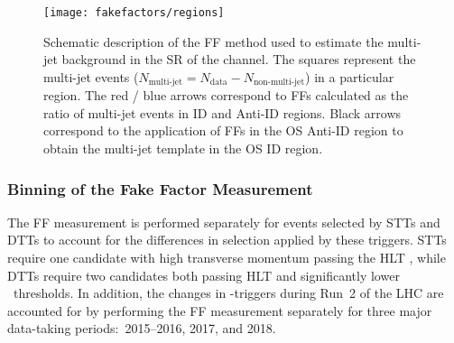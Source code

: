 \begin{figure}[htbp]
  \centering

  \texttt{[image: fakefactors/regions]}

  \caption{Schematic description of the FF method used to estimate the multi-jet
    background in the SR of the \hadhad channel. The squares represent the
    multi-jet events
    ($N_\text{multi-jet} = N_\text{data} - N_\text{non-multi-jet}$) in a
    particular region. The red / blue arrows correspond to FFs calculated as the
    ratio of multi-jet events in ID and Anti-ID regions. Black arrows correspond
    to the application of FFs in the OS Anti-ID region to obtain the multi-jet
    template in the OS ID region.}
  \label{fig:fakefactor_regions}
\end{figure}



\subsubsection{Binning of the Fake Factor Measurement}

The FF measurement is performed separately for events selected by STTs and DTTs
to account for the differences in selection applied by these triggers. STTs
require one \tauhadvis candidate with high transverse momentum passing the HLT
\tauid, while DTTs require two \tauhadvis candidates both passing HLT \tauid and
significantly lower \pT~thresholds. In addition, the changes in
\tauhadvis-triggers during Run~2 of the LHC are accounted for by performing the
FF measurement separately for three major data-taking periods:~2015--2016, 2017,
and 2018.

%

